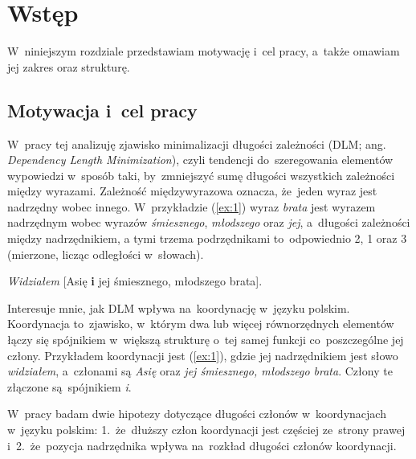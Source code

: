 \documentclass[licencjacka]{pracamgr_Kogni}
\begin{document}
    \chapter{Wstęp}\label{ch:wstep}
    W~niniejszym rozdziale przedstawiam motywację i~cel pracy, a~także omawiam jej zakres oraz strukturę.


    \section{Motywacja i~cel pracy}\label{sec:motywacja-icel-pracy}

    W~pracy tej analizuję zjawisko minimalizacji długości zależności (DLM; ang. \textit{Dependency Length Minimization}), czyli tendencji do~szeregowania elementów wypowiedzi w~sposób taki, by~zmniejszyć sumę długości wszystkich zależności między wyrazami.
    Zależność międzywyrazowa oznacza, że~jeden wyraz jest nadrzędny wobec innego.
    W~przykładzie (\ref{ex:1}) wyraz \textit{brata} jest wyrazem nadrzędnym wobec wyrazów \textit{śmiesznego}, \textit{młodszego} oraz \textit{jej}, a~długości zależności między nadrzędnikiem, a tymi trzema podrzędnikami to~odpowiednio 2, 1 oraz 3 (mierzone, licząc odległości w~słowach).
    \begin{exe}
        \ex
        \textit{Widziałem} [Asię \textbf{i} jej śmiesznego, młodszego brata].
        \label {ex:1}
    \end{exe}

    Interesuje mnie, jak DLM wpływa na~koordynację w~języku polskim.
    Koordynacja to~zjawisko, w~którym dwa lub więcej równorzędnych elementów łączy się spójnikiem w~większą strukturę o~tej samej funkcji co~poszczególne jej człony.
    Przykładem koordynacji jest (\ref{ex:1}), gdzie jej nadrzędnikiem jest słowo \textit{widziałem}, a~członami są \textit{Asię} oraz \textit{jej śmiesznego, młodszego brata}.
    Człony te złączone są~spójnikiem \textit{i}.

    W~pracy badam dwie hipotezy dotyczące długości członów w~koordynacjach w~języku polskim: 1.~że~dłuższy człon koordynacji jest częściej ze~strony prawej i~2.~że~pozycja nadrzędnika wpływa na~rozkład długości członów koordynacji.
\end{document}
